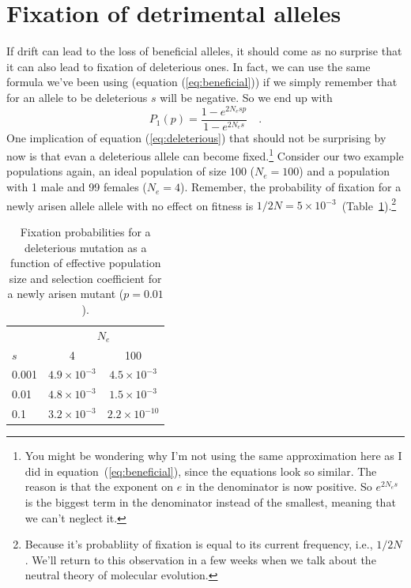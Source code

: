 \documentclass[12pt]{article}
\begin{document}
\section*{Fixation of detrimental alleles}

If drift can lead to the loss of beneficial alleles, it should come as
no surprise that it can also lead to fixation of deleterious ones. In
fact, we can use the same formula we've been using (equation
(\ref{eq:beneficial})) if we simply remember that for an allele to be
deleterious $s$ will be negative. So we end up with
\begin{equation}
P_1(p) = \frac{1 - e^{2N_esp}}{1 - e^{2N_es}} \quad .
\label{eq:deleterious}
\end{equation}
One implication of equation (\ref{eq:deleterious}) that should not be
surprising by now is that evan a deleterious allele can become
fixed.\footnote{You might be wondering why I'm not using the same
  approximation here as I did in equation~(\ref{eq:beneficial}), since
  the equations look so similar. The reason is that the exponent on
  $e$ in the denominator is now positive. So $e^{2N_es}$ is the
  biggest term in the denominator instead of the smallest, meaning
  that we can't neglect it.} Consider our two example populations
again, an ideal population of size 100 ($N_e = 100$) and a population
with 1 male and 99 females ($N_e = 4$). Remember, the probability of
fixation for a newly arisen allele allele with no effect on fitness is
$1/2N = 5 \times
10^{-3}$~(Table~\ref{table:fixation}).\footnote{Because
  it's probabliity of fixation is equal to its current frequency,
  i.e., $1/2N$. We'll return to this observation in a few weeks when
  we talk about the neutral theory of molecular evolution.}

\begin{table}
\begin{center}
\begin{tabular}{l|cc}
\hline\hline
      & \multicolumn{2}{c}{$N_e$} \\
$s$   & 4                  & 100 \\
\hline
0.001 & $4.9 \times 10^{-3}$ & $4.5 \times 10^{-3}$ \\
0.01  & $4.8 \times 10^{-3}$ & $1.5 \times 10^{-3}$ \\
0.1   & $3.2 \times 10^{-3}$ & $2.2 \times 10^{-10}$ \\
\hline
\end{tabular}
\end{center}
\caption{Fixation probabilities for a deleterious mutation as a
function of effective population size and selection coefficient for a
newly arisen mutant ($p=0.01$).}\label{table:fixation}
\end{table}
\end{document}

